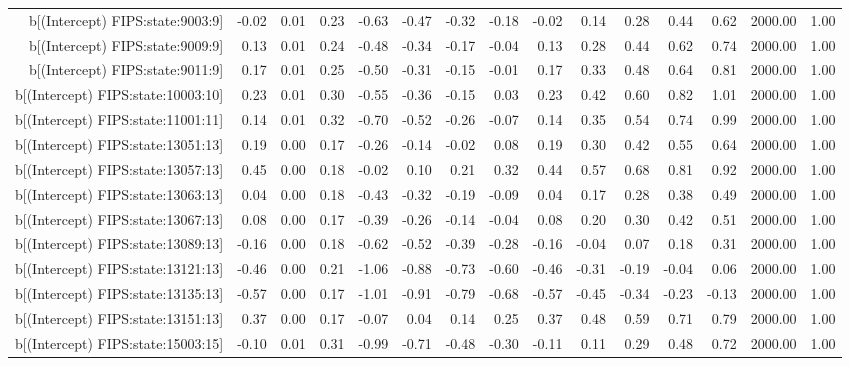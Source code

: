 \begin{table}[ht]
\begin{tabular}{rrrrrrrrrrrrrrr}
  b[(Intercept) FIPS:state:9003:9] & -0.02 & 0.01 & 0.23 & -0.63 & -0.47 & -0.32 & -0.18 & -0.02 & 0.14 & 0.28 & 0.44 & 0.62 & 2000.00 & 1.00 \\ 
  b[(Intercept) FIPS:state:9009:9] & 0.13 & 0.01 & 0.24 & -0.48 & -0.34 & -0.17 & -0.04 & 0.13 & 0.28 & 0.44 & 0.62 & 0.74 & 2000.00 & 1.00 \\ 
  b[(Intercept) FIPS:state:9011:9] & 0.17 & 0.01 & 0.25 & -0.50 & -0.31 & -0.15 & -0.01 & 0.17 & 0.33 & 0.48 & 0.64 & 0.81 & 2000.00 & 1.00 \\ 
  b[(Intercept) FIPS:state:10003:10] & 0.23 & 0.01 & 0.30 & -0.55 & -0.36 & -0.15 & 0.03 & 0.23 & 0.42 & 0.60 & 0.82 & 1.01 & 2000.00 & 1.00 \\ 
  b[(Intercept) FIPS:state:11001:11] & 0.14 & 0.01 & 0.32 & -0.70 & -0.52 & -0.26 & -0.07 & 0.14 & 0.35 & 0.54 & 0.74 & 0.99 & 2000.00 & 1.00 \\ 
  b[(Intercept) FIPS:state:13051:13] & 0.19 & 0.00 & 0.17 & -0.26 & -0.14 & -0.02 & 0.08 & 0.19 & 0.30 & 0.42 & 0.55 & 0.64 & 2000.00 & 1.00 \\ 
  b[(Intercept) FIPS:state:13057:13] & 0.45 & 0.00 & 0.18 & -0.02 & 0.10 & 0.21 & 0.32 & 0.44 & 0.57 & 0.68 & 0.81 & 0.92 & 2000.00 & 1.00 \\ 
  b[(Intercept) FIPS:state:13063:13] & 0.04 & 0.00 & 0.18 & -0.43 & -0.32 & -0.19 & -0.09 & 0.04 & 0.17 & 0.28 & 0.38 & 0.49 & 2000.00 & 1.00 \\ 
  b[(Intercept) FIPS:state:13067:13] & 0.08 & 0.00 & 0.17 & -0.39 & -0.26 & -0.14 & -0.04 & 0.08 & 0.20 & 0.30 & 0.42 & 0.51 & 2000.00 & 1.00 \\ 
  b[(Intercept) FIPS:state:13089:13] & -0.16 & 0.00 & 0.18 & -0.62 & -0.52 & -0.39 & -0.28 & -0.16 & -0.04 & 0.07 & 0.18 & 0.31 & 2000.00 & 1.00 \\ 
  b[(Intercept) FIPS:state:13121:13] & -0.46 & 0.00 & 0.21 & -1.06 & -0.88 & -0.73 & -0.60 & -0.46 & -0.31 & -0.19 & -0.04 & 0.06 & 2000.00 & 1.00 \\ 
  b[(Intercept) FIPS:state:13135:13] & -0.57 & 0.00 & 0.17 & -1.01 & -0.91 & -0.79 & -0.68 & -0.57 & -0.45 & -0.34 & -0.23 & -0.13 & 2000.00 & 1.00 \\ 
  b[(Intercept) FIPS:state:13151:13] & 0.37 & 0.00 & 0.17 & -0.07 & 0.04 & 0.14 & 0.25 & 0.37 & 0.48 & 0.59 & 0.71 & 0.79 & 2000.00 & 1.00 \\ 
  b[(Intercept) FIPS:state:15003:15] & -0.10 & 0.01 & 0.31 & -0.99 & -0.71 & -0.48 & -0.30 & -0.11 & 0.11 & 0.29 & 0.48 & 0.72 & 2000.00 & 1.00 \\ 

\end{tabular}
\end{table}
